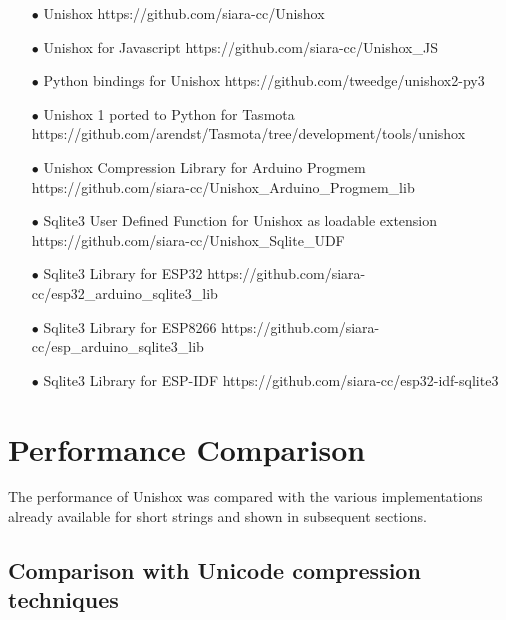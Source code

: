 \documentclass[]{article}
\begin{document}
	\begin{itemize}
		\item[$\bullet$] Unishox \newline https://github.com/siara-cc/Unishox
		\item[$\bullet$] Unishox for Javascript \newline https://github.com/siara-cc/Unishox\_JS
		\item[$\bullet$] Python bindings for Unishox \newline https://github.com/tweedge/unishox2-py3
		\item[$\bullet$] Unishox 1 ported to Python for Tasmota \newline https://github.com/arendst/Tasmota/tree/development/tools/unishox
		\item[$\bullet$] Unishox Compression Library for Arduino Progmem \newline https://github.com/siara-cc/Unishox\_Arduino\_Progmem\_lib
		\item[$\bullet$] Sqlite3 User Defined Function for Unishox as loadable extension \newline https://github.com/siara-cc/Unishox\_Sqlite\_UDF
		\item[$\bullet$] Sqlite3 Library for ESP32 \newline https://github.com/siara-cc/esp32\_arduino\_sqlite3\_lib
		\item[$\bullet$] Sqlite3 Library for ESP8266 \newline https://github.com/siara-cc/esp\_arduino\_sqlite3\_lib
		\item[$\bullet$] Sqlite3 Library for ESP-IDF \newline https://github.com/siara-cc/esp32-idf-sqlite3
	\end{itemize}
	
	\section{Performance Comparison}
	
	The performance of Unishox was compared with the various implementations already available for short strings and shown in subsequent sections.
	
	\subsection{Comparison with Unicode compression techniques}
	
\end{document}
